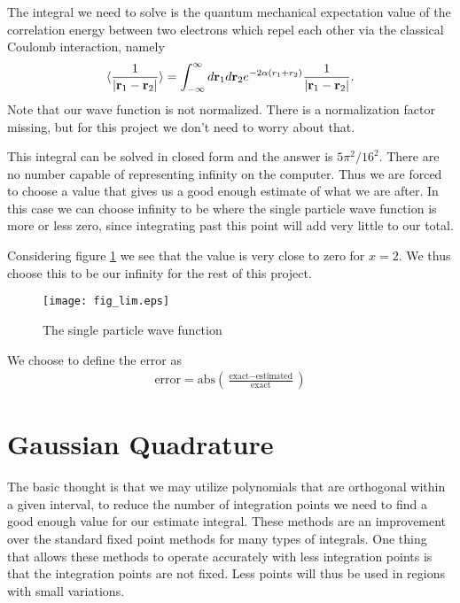 \documentclass[11pt, a4paper]{article}
\begin{document}
The integral we need to solve is the quantum mechanical expectation value of the correlation
energy between two electrons which repel each other via the classical Coulomb interaction, namely
\begin{equation}\label{eq:correlationenergy}
   \langle \frac{1}{|{\bf r}_1-{\bf r}_2|} \rangle =
   \int_{-\infty}^{\infty} d{\bf r}_1d{\bf r}_2  e^{-2\alpha (r_1+r_2)}\frac{1}{|{\bf r}_1-{\bf r}_2|}.
\end{equation}
Note that our wave function is not normalized. There is a normalization factor missing, but for this project
we don't need to worry about that.

This integral can be solved in closed form and the answer is $5\pi^2/16^2$.
There are no number capable of representing infinity on the computer. Thus we are forced to choose a value that gives us a good enough estimate of what we are after. In this case we can choose infinity to be where the single particle wave function is more or less zero, since integrating past this point will add very little to our total.

Considering figure \ref{fig:lim} we see that the value is very close to zero for $x = 2$. We thus choose this to be our infinity for the rest of this project.

\begin{figure}[!ht]
\texttt{[image: fig\_lim.eps]}
\caption{The single particle wave function}
\label{fig:lim}
\end{figure}

We choose to define the error as
\begin{gather}
\text{error} = \text{abs}\left(\frac{\text{exact}-\text{estimated}}{\text{exact}}\right)
\end{gather}

\section{Gaussian Quadrature}
The basic thought is that we may utilize polynomials that are orthogonal within a given interval, to reduce the number of integration points we need to find a good enough value for our estimate integral. These methods are an improvement over the standard fixed point methods for many types of integrals. One thing that allows these methods to operate accurately with less integration points is that the integration points are not fixed. Less points will thus be used in regions with small variations. 
\end{document}
